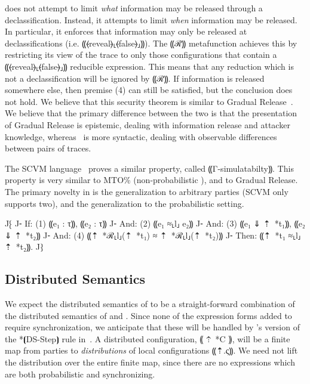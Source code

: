 does not attempt to limit \emph{what} information may be released through a declassification.
Instead, it attempts to limit \emph{when} information may be released. In particular, it enforces that information may
only be released at declassifications (i.e. ⸨⦑reveal⦒⸤⦑false⦒⸥⸩). The ⸨ℛ⸩ metafunction achieves this by restricting
its view of the trace to only those configurations that contain a ⸨⦑reveal⦒⸤⦑false⦒⸥⸩ reducible expression. This means
that any reduction which is not a declassification will be ignored by ⸨ℛ⸩. If information is released somewhere else,
then premise (4) can still be satisfied, but the conclusion does not hold. We believe that this security theorem is
similar to Gradual Release~\cite{todo}. We believe that the primary difference between the two is that the presentation
of Gradual Release is epistemic, dealing with information release and attacker knowledge, whereas~
is more syntactic, dealing with observable differences between pairs of traces.

The SCVM language~\cite{todo} proves a similar property, called ⸨Γ-simulatabilty⸩. This property is very similar to MTO\%
(non-probabilistic ), and to Gradual Release. The primary novelty in \lang is the generalization to
arbitrary parties (SCVM only supports two), and the generalization to the probabilistic setting.

\begin{theorem}[PMTO\%]\label{thm:lang-pmto}
  J⁅
  J⁃ If:  (1) ⸨e₁ : τ⸩, ⸨e₂ : τ⸩
  J⁃ And: (2) ⸨e₁ ≈⸤l⸥ e₂⸩
  J⁃ And: (3) ⸨e₁ ⇓ ⇡~*{t₁}⸩, ⸨e₂ ⇓ ⇡~*{t₂}⸩
  J⁃ And: (4) ⸨⇡~*ℛ⸤l⸥(⇡~*{t₁}) ≈ ⇡~*ℛ⸤l⸥(⇡~*{t₂})⸩
  J⁃ Then: ⸨⇡~*{t₁} ≈⸤l⸥ ⇡~*{t₂}⸩.
  J⁆
\end{theorem}

\subsection{Distributed Semantics}
\label{subsec:proposal-design-dist}

We expect the distributed semantics of \lang to be a straight-forward combination of the
distributed semantics of \mpc and \obliv. Since none of the expression forms added to
\lang require synchronization, we anticipate that these will be handled by \lang's version
of the *⦗DS-Step⦘ rule in~. A \lang distributed configuration, ⸨ ⇡~*C ⸩,
will be a finite map from parties to \emph{distributions} of local configurations ⸨⇡.ς⸩.
We need not lift the distribution over the entire finite map, since there are no expressions
which are both probabilistic and synchronizing.

